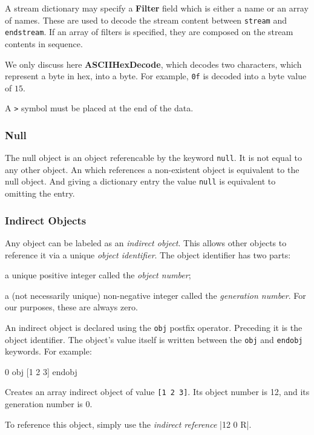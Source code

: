 
A stream dictionary may specify a {\bf Filter} field which is either a name or an array of names.
These are used to decode the stream content between {\tt stream} and {\tt endstream}.
If an array of filters is specified, they are composed on the stream contents in sequence.

We only discuss here {\bf ASCIIHexDecode}, which decodes two characters, which represent a byte in hex, into
a byte.
For example, {\tt 0f} is decoded into a byte value of $15$.

\bnote
    A {\tt>} symbol must be placed at the end of the data.
\eppbox

\subsubsection{Null}

The null object is an object referencable by the keyword {\tt null}.
It is not equal to any other object.
An  which references a non-existent object is equivalent to the
null object.
And giving a dictionary entry the value {\tt null} is equivalent to omitting the entry.

\subsubsection{Indirect Objects} 

Any object can be labeled as an {\it indirect object}.
This allows other objects to reference it via a unique {\it object identifier}.
The object identifier has two parts:
\benum
    \item a unique positive integer called the {\it object number};
    \item a (not necessarily unique) non-negative integer called the {\it generation number}.
        For our purposes, these are always zero.
\eenum

An indirect object is declared using the {\tt obj} postfix operator.
Preceding it is the object identifier.
The object's value itself is written between the {\tt obj} and {\tt endobj} keywords.
For example:

 0 obj
    [1 2 3]
endobj
\elisting

Creates an array indirect object of value {\tt[1 2 3]}.
Its object number is 12, and its generation number is 0.

To reference this object, simply use the {\it indirect reference} \inlinecode|12 0 R|.

